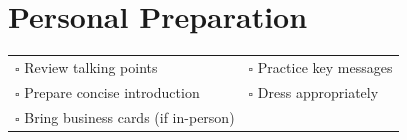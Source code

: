 
\section{Personal Preparation}
\label{sec:personal}

\begin{tabular}{p{9cm} p{8cm}}
$\square$ Review talking points & $\square$ Practice key messages \\ 
$\square$ Prepare concise introduction & $\square$ Dress appropriately \\ 
$\square$ Bring business cards (if in-person) & \\ 
\end{tabular}

